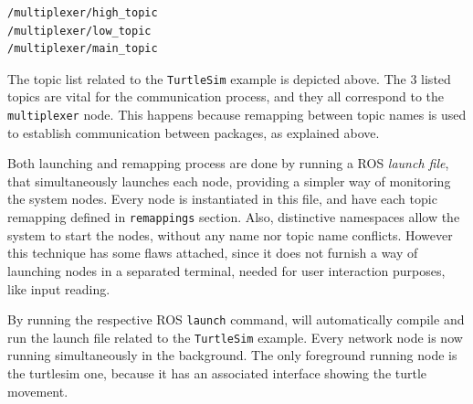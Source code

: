 \begin{lstlisting}[title={The \texttt{TurtleSim} topic list.}]
/multiplexer/high_topic
/multiplexer/low_topic
/multiplexer/main_topic
\end{lstlisting}

The topic list related to the \texttt{TurtleSim} example is depicted above. The 3 listed topics are vital for the communication process, and they all correspond to the \texttt{multiplexer} node. This happens because remapping between topic names is used to establish communication between packages, as explained above. 

Both launching and remapping process are done by running a ROS \textit{launch file}, that simultaneously launches each node, providing a simpler way of monitoring the system nodes. Every node is instantiated in this file, and have each topic remapping defined in \texttt{remappings} section. Also, distinctive namespaces allow the system to start the nodes, without any name nor topic name conflicts. However this technique has some flaws attached, since it does not furnish a way of launching nodes in a separated terminal, needed for user interaction purposes, like input reading.


By running the respective ROS \texttt{launch} command, will automatically compile and run the launch file related to the \texttt{TurtleSim} example. Every network node is now running simultaneously in the background. The only foreground running node is the turtlesim one, because it has an associated interface showing the turtle movement.

